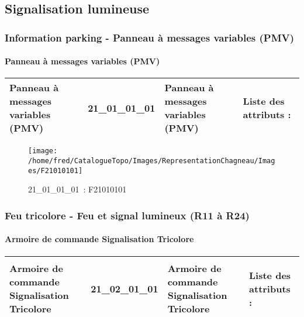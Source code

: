 \documentclass[12pt,titlepage,oneside]{book}
\begin{document}
\subsection{Signalisation lumineuse}
\subsubsection{\large Information parking - Panneau à messages variables (PMV)}
\paragraph{Panneau à messages variables (PMV)}
\noindent
\vspace{\baselineskip}

\renewcommand{\arraystretch}{1.2}
\begin{supertabular}{|p{10cm}|c|p{13cm}|p{12cm}|}
 Panneau à messages variables (PMV) & 21\_01\_01\_01 & Panneau à messages variables (PMV) & Liste des attributs :
\begin{enumerate}
\end{enumerate}
\\
\hline
\end{supertabular}
\begin{figure}[h!]
  \hfill         %
  \begin{minipage}[t]{3cm}
    \begin{center}
      \texttt{[image: /home/fred/CatalogueTopo/Images/RepresentationChagneau/Images/F21010101]}
      \caption[~21\_01\_01\_01]{\small{21\_01\_01\_01~:} \tiny{F21010101}}\label{F21010101}
    \end{center}
  \end{minipage}
\end{figure}

\subsubsection{\large Feu tricolore - Feu et signal lumineux (R11 à R24)}
\paragraph{Armoire de commande Signalisation Tricolore}
\noindent
\vspace{\baselineskip}

\renewcommand{\arraystretch}{1.2}
\begin{supertabular}{|p{10cm}|c|p{13cm}|p{12cm}|}
 Armoire de commande Signalisation Tricolore & 21\_02\_01\_01 & Armoire de commande Signalisation Tricolore & Liste des attributs :
\begin{enumerate}
\end{enumerate}
\\
\hline
\end{supertabular}
\begin{figure}[h!]
  \hfill         %
\end{figure}
\end{document}
